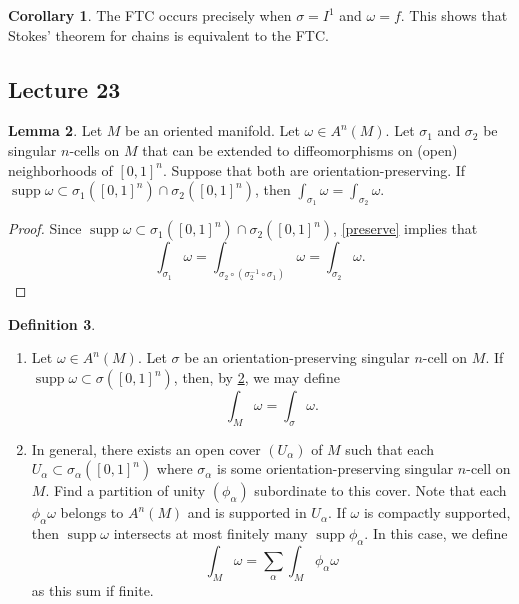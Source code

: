 \documentclass[10pt,letterpaper,cm]{nupset}
\theoremstyle{definition}
\newtheorem{definition}{Definition}[subsection]
\theoremstyle{theorem}
\newtheorem{lemma}[definition]{Lemma}
\newtheorem{corollary}[definition]{Corollary}
\theoremstyle{remark}
\newcommand{\1}{\mathbf{1}}
\newcommand{\0}{\vec 0}
\DeclareMathOperator{\supp}{supp}
\begin{document}
\begin{corollary}
The FTC occurs precisely when $\sigma = I^1$ and $\omega = f$. This shows that Stokes' theorem for chains is equivalent to the FTC.
\end{corollary}

\subsection{Lecture 23}

\begin{lemma}\label{orient}
Let $M$ be an oriented manifold. Let $\omega \in A^n(M)$. Let $\sigma_1$ and $\sigma_2$ be singular $n$-cells on $M$ that can be extended to diffeomorphisms on (open) neighborhoods of $[0,1]^n$. Suppose that both are orientation-preserving. If $\supp \omega \subset  \sigma_1([0,1]^n) \cap \sigma_2([0,1]^n)$, then $\int_{\sigma_1} \omega = \int_{\sigma_2} \omega$.
\end{lemma}
\begin{proof}
Since $\supp \omega \subset  \sigma_1([0,1]^n) \cap \sigma_2([0,1]^n)$, \cref{preserve} implies that $$\int_{\sigma_1} \omega = \int_{\sigma_2 \circ (\sigma_2^{-1} \circ \sigma_1)} \omega  = \int_{\sigma_2} \omega     .$$
\end{proof}

\begin{definition}\label{d2} $ $
\begin{enumerate}
\item Let $\omega \in A^n(M)$. Let $\sigma$ be an orientation-preserving singular $n$-cell on $M$. If $\supp \omega \subset \sigma([0,1]^n)$, then, by \cref{orient}, we may define $$\int_M \omega = \int_{\sigma} \omega.$$
\item In general, there exists an open cover $(U_{\alpha})$ of $M$ such that each $U_{\alpha} \subset \sigma_{\alpha}([0,1]^n)$ where $\sigma_{\alpha}$ is some orientation-preserving singular $n$-cell on $M$. Find a partition of unity $(\phi_{\alpha})$ subordinate to this cover. Note that each $\phi_{\alpha} \omega$ belongs to  $A^n(M)$ and is supported in $U_{\alpha}$. If $\omega$ is compactly supported, then $\supp \omega$ intersects at most finitely many $\supp \phi_{\alpha}$. In this case, we define $$\int_M \omega = \sum_{\alpha}  \int_M \phi_{\alpha} \omega$$ as this sum if finite. 
\end{enumerate}
\end{definition}
\end{document}
